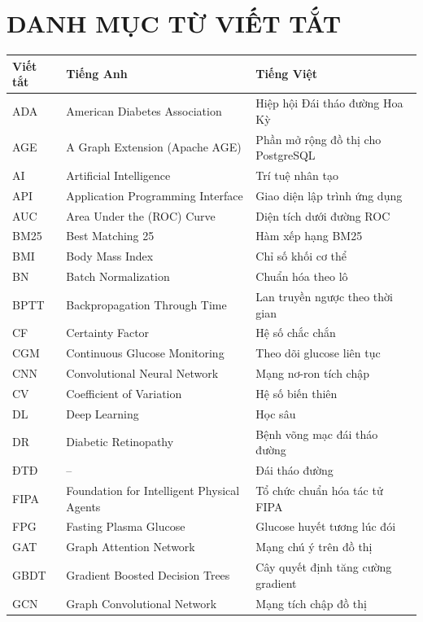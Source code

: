 \chapter*{DANH MỤC TỪ VIẾT TẮT}
\begin{spacing}{1.1}
\small
\begin{longtable}{@{}L{2.3cm}L{6.3cm}L{6.0cm}@{}}
\toprule
\textbf{Viết tắt} & \textbf{Tiếng Anh} & \textbf{Tiếng Việt} \\
\midrule
\endhead
ADA & American Diabetes Association & Hiệp hội Đái tháo đường Hoa Kỳ \\
AGE & A Graph Extension (Apache AGE) & Phần mở rộng đồ thị cho PostgreSQL \\
AI & Artificial Intelligence & Trí tuệ nhân tạo \\
API & Application Programming Interface & Giao diện lập trình ứng dụng \\
AUC & Area Under the (ROC) Curve & Diện tích dưới đường ROC \\
BM25 & Best Matching 25 & Hàm xếp hạng BM25 \\
BMI & Body Mass Index & Chỉ số khối cơ thể \\
BN & Batch Normalization & Chuẩn hóa theo lô \\
BPTT & Backpropagation Through Time & Lan truyền ngược theo thời gian \\
CF & Certainty Factor & Hệ số chắc chắn \\
CGM & Continuous Glucose Monitoring & Theo dõi glucose liên tục \\
CNN & Convolutional Neural Network & Mạng nơ-ron tích chập \\
CV & Coefficient of Variation & Hệ số biến thiên \\
DL & Deep Learning & Học sâu \\
DR & Diabetic Retinopathy & Bệnh võng mạc đái tháo đường \\
ĐTĐ & -- & Đái tháo đường \\
FIPA & Foundation for Intelligent Physical Agents & Tổ chức chuẩn hóa tác tử FIPA \\
FPG & Fasting Plasma Glucose & Glucose huyết tương lúc đói \\
GAT & Graph Attention Network & Mạng chú ý trên đồ thị \\
GBDT & Gradient Boosted Decision Trees & Cây quyết định tăng cường gradient \\
GCN & Graph Convolutional Network & Mạng tích chập đồ thị \\

\end{longtable}
\end{spacing}
